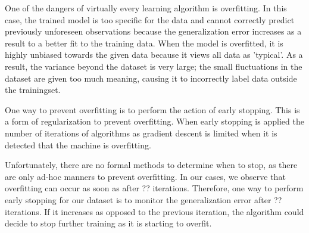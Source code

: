 One of the dangers of virtually every learning algorithm is overfitting. 
In this case, the trained model is too specific for the data and cannot correctly predict previously unforeseen observations because the generalization error increases as a result to a better fit to the training data. 
When the model is overfitted, it is highly unbiased towards the given data because it views all data as 'typical'.
As a result, the variance beyond the dataset is very large; the small fluctuations in the dataset are given too much meaning, causing it to incorrectly label data outside the trainingset.

One way to prevent overfitting is to perform the action of early stopping. 
This is a form of regularization to prevent overfitting. 
When early stopping is applied the number of iterations of algorithms as gradient descent is limited when it is detected that the machine is overfitting. 

Unfortunately, there are no formal methods to determine when to stop, as there are only ad-hoc manners to prevent overfitting. 
In our cases, we observe that overfitting can occur as soon as after ?? iterations. 
Therefore, one way to perform early stopping for our dataset is to monitor the generalization error after ?? iterations.
If it increases as opposed to the previous iteration, the algorithm could decide to stop further training as it is starting to overfit.